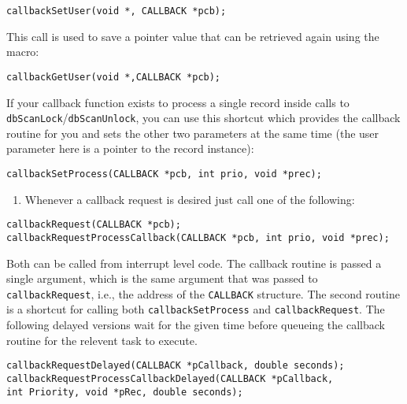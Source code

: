 \begin{description}
\end{description}\begin{verbatim}
callbackSetUser(void *, CALLBACK *pcb);

\end{verbatim}\begin{description}\item This call is used to save a pointer value that can be retrieved again using the macro:

\end{description}\begin{verbatim}
callbackGetUser(void *,CALLBACK *pcb);

\end{verbatim}\begin{description}\item If your callback function exists to process a single record inside calls to \verb|dbScanLock|/\verb|dbScanUnlock|, you can 
use this shortcut which provides the callback routine for you and sets the other two parameters at the same time 
(the user parameter here is a pointer to the record instance):

\end{description}\begin{verbatim}
callbackSetProcess(CALLBACK *pcb, int prio, void *prec);

\end{verbatim}\begin{enumerate}\item Whenever a callback request is desired just call one of the following:

\end{enumerate}\begin{verbatim}
callbackRequest(CALLBACK *pcb);
callbackRequestProcessCallback(CALLBACK *pcb, int prio, void *prec);

\end{verbatim}
\begin{description}\item Both can be called from interrupt level code. The callback routine is passed a single argument, which is the same 
argument that was passed to \verb|callbackRequest|, i.e., the address of the \verb|CALLBACK| structure. The second 
routine is a shortcut for calling both \verb|callbackSetProcess| and \verb|callbackRequest|. The following delayed 
versions wait for the given time before queueing the callback routine for the relevent task to execute.

\end{description}\begin{verbatim}
callbackRequestDelayed(CALLBACK *pCallback, double seconds);
callbackRequestProcessCallbackDelayed(CALLBACK *pCallback,
int Priority, void *pRec, double seconds);

\end{verbatim}
